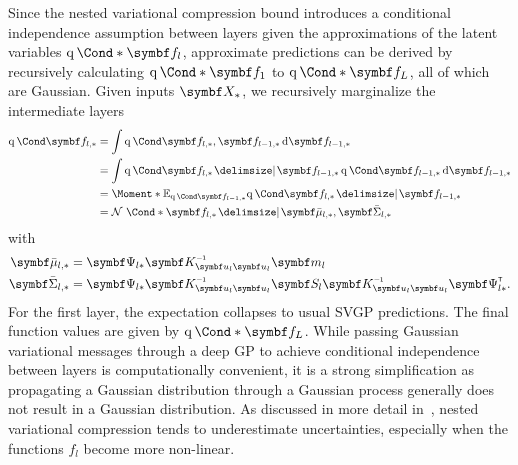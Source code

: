 Since the nested variational compression bound introduces a conditional independence assumption between layers given the approximations of the latent variables $\Variat*{\mat{f}_l}$, approximate predictions can be derived by recursively calculating $\Variat*{\mat{f}_1}$ to $\Variat*{\mat{f}_L}$, all of which are Gaussian.
Given inputs $\mat{X_{\ast}}$, we recursively marginalize the intermediate layers
\begin{equation}
    \begin{split}
        \Variat{\mat{f}_{l, \ast}}
        &= \int \Variat{\mat{f}_{l, \ast}, \mat{f}_{l-1, \ast}} \diff \mat{f}_{l-1, \ast} \\
        &= \int \Variat{\mat{f}_{l, \ast} \given \mat{f}_{l-1, \ast}} \Variat{\mat{f}_{l-1, \ast}} \diff \mat{f}_{l-1, \ast} \\
        &= \Moment*{\E_{\Variat{\mat{f}_{l-1, \ast}}}}{\Variat{\mat{f}_{l, \ast} \given \mat{f}_{l-1, \ast}}} \\
        &= \Gaussian*{\mat{f}_{l, \ast} \given \mat{\bar{\mu}}_{l, \ast}, \mat{\bar{\Sigma}}_{l, \ast}}
    \end{split}
\end{equation}
with
\begin{align*}
    \mat{\bar{\mu}}_{l, \ast}    & = \mat{\Psi}_{l\ast} \mat{K}_{\mat{u}_l \mat{u}_l    }\inv \mat{m}_l                                                    \\
    \mat{\bar{\Sigma}_{l, \ast}} & = \mat{\Psi}_{l\ast}\mat{K}_{\mat{u}_l \mat{u}_l}\inv\mat{S}_l\mat{K}_{\mat{u}_l \mat{u}_l}\inv\mat{\Psi}_{l\ast}\tran.
\end{align*}
For the first layer, the expectation collapses to usual SVGP predictions.
The final function values are given by $\Variat*{\mat{f}_L}$.
While passing Gaussian variational messages through a deep GP to achieve conditional independence between layers is computationally convenient, it is a strong simplification as propagating a Gaussian distribution through a Gaussian process generally does not result in a Gaussian distribution.
As discussed in more detail in~\parencite{hensman_nested_2014}, nested variational compression tends to underestimate uncertainties, especially when the functions $f_l$ become more non-linear.

